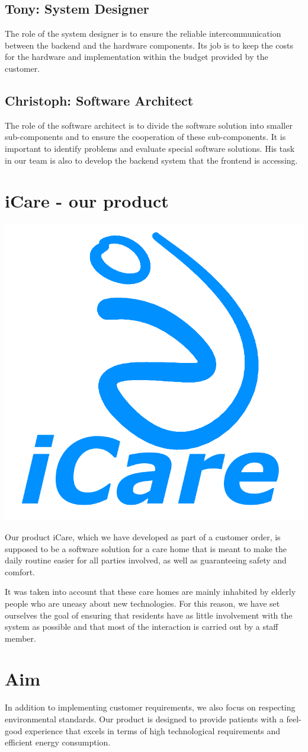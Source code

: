 \subsection{Tony: System Designer}
\label{sec:orgd672b29}
The role of the system designer is to ensure the reliable intercommunication between the backend and the hardware components.
Its job is to keep the costs for the hardware and implementation within the budget provided by the customer.
\subsection{Christoph: Software Architect}
\label{sec:orgd60e06e}
The role of the software architect is to divide the software solution into
smaller sub-components and to ensure the cooperation of these sub-components. It
is important to identify problems and evaluate special software solutions. His
task in our team is also to develop the backend system that the frontend is
accessing.

\section{iCare - our product}
\label{sec:org698e8a5}
\begin{center}
\includegraphics[width=.3\linewidth]{./content/iCare.jpeg}
\end{center}
Our product iCare, which we have developed as part of a customer order, is
supposed to be a software solution for a care home that is meant to make the
daily routine easier for all parties involved, as well as guaranteeing safety
and comfort.

It was taken into account that these care homes are mainly inhabited by elderly
people who are uneasy about new technologies. For this reason, we have set
ourselves the goal of ensuring that residents have as little involvement with
the system as possible and that most of the interaction is carried out by a
staff member.


\section{Aim}
\label{sec:orgaba15cc}
In addition to implementing customer requirements, we also focus on respecting
environmental standards. Our product is designed to provide patients with a
feel-good experience that excels in terms of high technological requirements and
efficient energy consumption.

